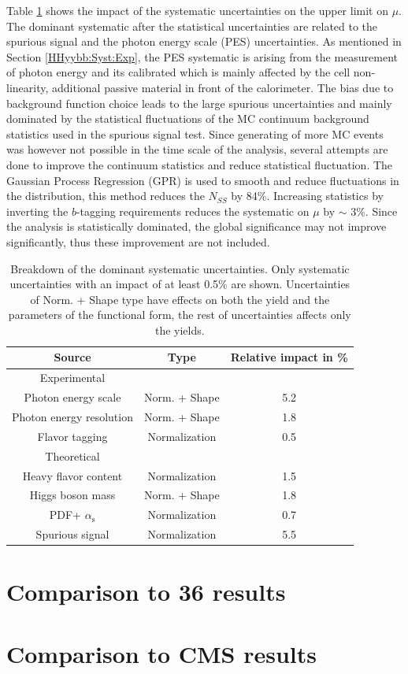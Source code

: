 Table \ref{tab:HHyybb:Results:Xsec:Sys} shows the impact of the systematic uncertainties on the upper limit on $\mu$. The dominant systematic after the statistical uncertainties are related to the spurious signal and the photon energy scale (PES) uncertainties. As mentioned in Section \ref{HHyybb:Syst:Exp}, the PES systematic is arising from the measurement of photon energy and its calibrated which is mainly affected by the cell non-linearity, additional passive material in front of the calorimeter. The bias due to background function choice leads to the large spurious uncertainties and mainly dominated by the statistical fluctuations of the MC continuum background statistics used in the spurious signal test. Since generating of more MC events was however not possible in the time scale of the analysis, several attempts are done to improve the continuum statistics and reduce statistical fluctuation. The Gaussian Process Regression (GPR) \cite{GPR} is used to smooth and reduce fluctuations in the \myy distribution, this method reduces the $N_{SS}$ by 84\%. Increasing statistics by inverting the $b$-tagging requirements reduces the systematic on $\mu$ by $\sim$ 3\%. Since the analysis is statistically dominated, the global significance may not improve significantly, thus these improvement are not included.  
\begin{table}[ht]
    \centering
    \begin{tabular}{ccc}
\hline \hline 
Source & Type & Relative impact in \%  \\
\hline Experimental & & \\
\hline Photon energy scale & Norm. + Shape & 5.2  \\
Photon energy resolution & Norm. + Shape & 1.8  \\
Flavor tagging & Normalization & 0.5  \\
\hline Theoretical & & \\
\hline Heavy flavor content & Normalization & 1.5  \\
Higgs boson mass & Norm. + Shape & 1.8  \\
PDF+ $\alpha_{\mathrm{s}}$ & Normalization & 0.7  \\
\hline Spurious signal & Normalization & 5.5 \\
\hline \hline
\end{tabular}
    \caption{Breakdown of the dominant systematic uncertainties. Only systematic uncertainties with an impact of at least 0.5\% are shown. Uncertainties of Norm. + Shape type have effects on both the yield and the parameters of the functional form, the rest of uncertainties affects only the yields.}
    \label{tab:HHyybb:Results:Xsec:Sys}
\end{table}

\section{Comparison to 36 \ifb results}
\label{HHyybb:36ifb}

\section{Comparison to CMS \HHyybb results}
\label{HHyybb:CMS}